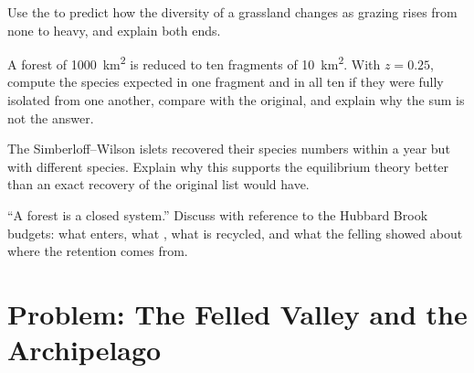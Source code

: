 \begin{exercise}[$\star\star$]\label{exo:b1:ecosystem-dynamics:9}
Use the  to predict how the
diversity of a grassland changes as grazing rises from none to
heavy, and explain both ends.
\end{exercise}

\begin{exercise}[$\star\star\star$]\label{exo:b1:ecosystem-dynamics:10}
A forest of \qty{1000}{km^2} is reduced to ten fragments of
\qty{10}{km^2}. With $z = 0.25$, compute the species expected in one
fragment and in all ten if they were fully isolated from one another,
compare with the original, and explain why the sum is not the answer.
\end{exercise}

\begin{exercise}[$\star\star\star$]\label{exo:b1:ecosystem-dynamics:11}
The Simberloff--Wilson islets recovered their species numbers within
a year but with different species. Explain why this supports the
equilibrium theory better than an exact recovery of the original
list would have.
\end{exercise}

\begin{exercise}[$\star\star\star$]\label{exo:b1:ecosystem-dynamics:12}
``A  forest is a closed system.'' Discuss with reference to the
Hubbard Brook budgets: what enters, what , what is recycled,
and what the felling showed about where the retention comes from.
\end{exercise}

\section{Problem: The Felled Valley and the Archipelago}

